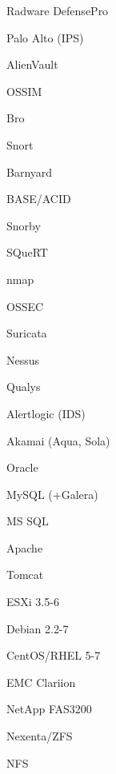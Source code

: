\documentclass[letterpaper,10pt,final]{memoir}
\begin{document}
{{
\begin{multicols}{4}
\begin{compactitem}[\color{Black}$\bullet$]
\item Radware DefensePro
\item Palo Alto (IPS)
\item AlienVault
\item OSSIM
\item Bro
\item Snort
\item Barnyard
\item BASE/ACID
\item Snorby
\item SQueRT
\item nmap
\item OSSEC
\item Suricata
\item Nessus
\item Qualys
\item Alertlogic (IDS)
\end{compactitem}
\end{multicols}
\SmallSep

\begin{multicols}{4}
\begin{compactitem}[\color{Black}$\bullet$]
\item Akamai (Aqua, Sola)
\item Oracle
\item MySQL (+Galera)
\item MS SQL
\item Apache
\item Tomcat
\end{compactitem}
\end{multicols}
\SmallSep

\begin{multicols}{4}
\begin{compactitem}[\color{Black}$\bullet$]
\item ESXi 3.5-6
\item Debian 2.2-7
\item CentOS/RHEL 5-7
\end{compactitem}
\end{multicols}
\SmallSep

\begin{multicols}{4}
\begin{compactitem}[\color{Black}$\bullet$]
\item EMC Clariion
\item NetApp FAS3200
\item Nexenta/ZFS
\item NFS
\end{compactitem}
\end{multicols}
\SmallSep

}}
\end{document}
